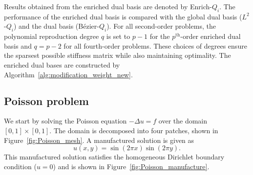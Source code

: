 Results obtained from the enriched dual basis are denoted by Enrich-$Q_i$. The performance of the enriched dual basis is compared with the global dual basis ($L^2$-$Q_i$) and the \Bezier dual basis (B\'ezier-$Q_i$). For all second-order problems, the polynomial reproduction degree $q$ is set to $p-1$ for the $p^\text{th}$-order enriched dual basis and $q=p-2$ for all fourth-order problems. These choices of degrees ensure the sparsest possible stiffness matrix while also maintaining optimality. The enriched dual bases are constructed by Algorithm~\ref{alg:modification_weight_new}.

\subsection{Poisson problem}\label{sec:poisson_problem}

We start by solving the Poisson equation $-\Delta u=f$ over the domain $\left[ 0, 1\right]\times \left[ 0, 1\right]$. The domain is decomposed into four patches, shown in Figure~\ref{fig:Poisson_mesh}. A manufactured solution is given as
\begin{equation}
	u(x,y) = \sin(2\pi x)\sin(2 \pi y).
\end{equation}
This manufactured solution satisfies the homogeneous Dirichlet boundary condition ($u=0$) and is shown in Figure~\ref{fig:Poisson_manufacture}.

